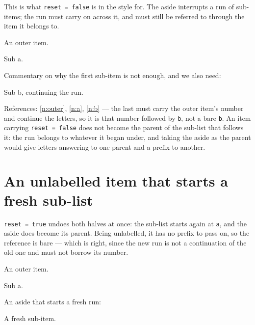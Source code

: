 \documentclass{article}
\begin{document}
This is what \texttt{reset = false} is in the style for.  The aside interrupts
a run of sub-items; the run must carry on across it, and must still be
referred to through the item it belongs to.

\begin{prop}
  \item An outer item. \label{n:outer}
  \begin{prop}
    \item Sub a. \label{n:a}
  \end{prop}
  \item[style=nolabel] Commentary on why the first sub-item is not enough,
    and we also need:
  \begin{prop}
    \item Sub b, continuing the run. \label{n:b}
  \end{prop}
\end{prop}

References: \ref{n:outer}, \ref{n:a}, \ref{n:b} --- the last must carry the
outer item's number and continue the letters, so it is that number followed by
\texttt{b}, not a bare \texttt{b}.  An item carrying \texttt{reset = false}
does not become the parent of the sub-list that follows it: the run belongs to
whatever it began under, and taking the aside as the parent would give letters
answering to one parent and a prefix to another.

\section{An unlabelled item that starts a fresh sub-list}

\texttt{reset = true} undoes both halves at once: the sub-list starts again at
\texttt{a}, and the aside does become its parent.  Being unlabelled, it has no
prefix to pass on, so the reference is bare --- which is right, since the new
run is not a continuation of the old one and must not borrow its number.

\begin{prop}
  \item An outer item. \label{n:r1}
  \begin{prop}
    \item Sub a. \label{n:ra}
  \end{prop}
  \item[style=nolabel, reset=true] An aside that starts a fresh run:
  \begin{prop}
    \item A fresh sub-item. \label{n:rb}
  \end{prop}
\end{prop}
\end{document}
